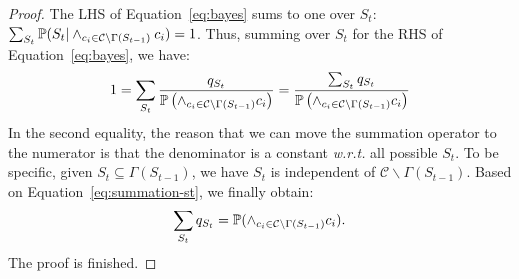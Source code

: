 \begin{lemma}
\begin{proof}
        The LHS of Equation~\eqref{eq:bayes} sums to one over $S_t$:
        $\sum_{S_t}\mathbb{P}(S_t |\wedge_{c_i \in \mathcal{C}\backslash
                \Gamma(S_{t-1})}c_i)=1$. Thus, summing over $S_t$ for the RHS of
        Equation~\eqref{eq:bayes}, we have:
        \begin{equation} \label{eq:summation-st}
            \begin{aligned}
                1=\sum_{S_t}\frac{q_{S_t} }{\mathbb{P} \left(\wedge_{c_i \in \mathcal{C}\backslash \Gamma(S_{t-1})}c_i\right) }=\frac{\sum_{S_t}q_{S_t} }{\mathbb{P} \left(\wedge_{c_i \in \mathcal{C}\backslash \Gamma(S_{t-1})}c_i\right) }
            \end{aligned}
        \end{equation}
        In the second equality, the reason that we can move the summation operator to  the numerator is that the denominator is a constant \textit{w.r.t.} all possible $S_t$. To be specific, given $S_t\subseteq\Gamma(S_{t-1})$, we have  $S_t$ is independent of $\mathcal{C}\backslash \Gamma(S_{t-1})$.
        Based on Equation~\eqref{eq:summation-st}, we finally obtain:
        \begin{equation*}
            \sum_{S_t}q_{S_t}=\mathbb{P}(\wedge_{c_i \in \mathcal{C}\backslash \Gamma(S_{t-1})}c_i).
        \end{equation*}
        The proof  is finished.
    \end{proof}
\end{lemma}

